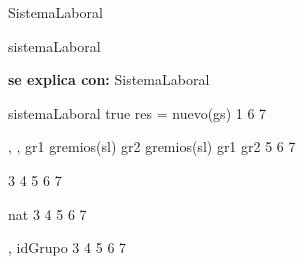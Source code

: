 \begin{interfaz}{SistemaLaboral}
\begin{iparamformales}{sistemaLaboral}

\textbf{\large se explica con:} SistemaLaboral

\end{iparamformales}

{}{sistemaLaboral}
{true}
{res = nuevo(gs)}
{1}
{6}
{7}

{, , }{}
{gr1 \in gremios(sl) \ly gr2 \in gremios(sl) \ly gr1 \distinto gr2 }
{}
{5}
{6}
{7}

{3}
{4}
{5}
{6}
{7}

{}{nat}
{3}
{4}
{5}
{6}
{7}

{, }{idGrupo}
{3}
{4}
{5}
{6}
{7}

\end{interfaz}